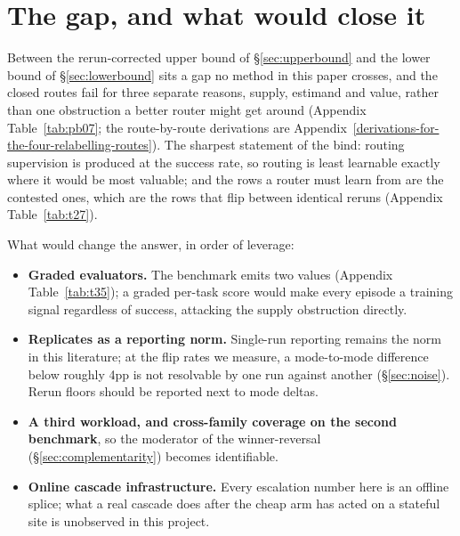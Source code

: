 \section{The gap, and what would close it}\label{sec:gap}

 Between the rerun-corrected upper bound of \S\ref{sec:upperbound} and the lower bound of \S\ref{sec:lowerbound} sits a gap no method in this paper crosses, and the closed routes fail for three separate reasons, supply, estimand and value, rather than one obstruction a better router might get around (Appendix Table~\ref{tab:pb07}; the route-by-route derivations are Appendix~\ref{derivations-for-the-four-relabelling-routes}). The sharpest statement of the bind: routing supervision is produced at the success rate, so routing is least learnable exactly where it would be most valuable; and the rows a router must learn from are the contested ones, which are the rows that flip between identical reruns (Appendix Table~\ref{tab:t27}).

What would change the answer, in order of leverage:

\begin{itemize}
\tightlist
\item
  \textbf{Graded evaluators.} The benchmark emits two values (Appendix Table~\ref{tab:t35}); a graded per-task score would make every episode a training signal regardless of success, attacking the supply obstruction directly.
\item
  \textbf{Replicates as a reporting norm.} Single-run reporting remains the norm in this literature; at the flip rates we measure, a mode-to-mode difference below roughly 4pp is not resolvable by one run against another (\S\ref{sec:noise}). Rerun floors should be reported next to mode deltas.
\item
  \textbf{A third workload, and cross-family coverage on the second benchmark}, so the moderator of the winner-reversal (\S\ref{sec:complementarity}) becomes identifiable.
\item
  \textbf{Online cascade infrastructure.} Every escalation number here is an offline splice; what a real cascade does after the cheap arm has acted on a stateful site is unobserved in this project.
\end{itemize}

